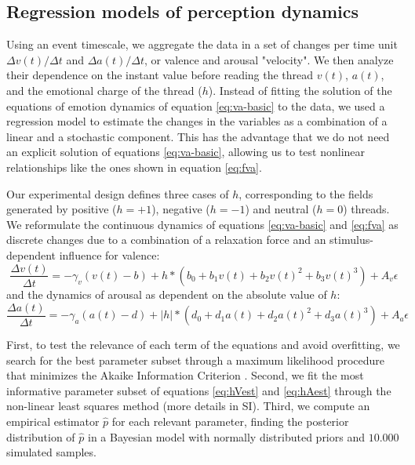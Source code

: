 \documentclass[nologo,url,11pt,a4paper]{ETHpaper}
\begin{document}
\subsection{Regression models of perception dynamics}

Using an event timescale, we aggregate the data in a set of changes per
time unit $\Delta v(t)/\Delta t$ and $\Delta a(t)/\Delta t$, or valence and arousal "velocity". 
We then analyze their dependence on the instant value before reading the thread $v(t)$, $a(t)$, and the emotional charge of the thread ($h$). 
Instead of fitting the solution of the equations of emotion dynamics of equation \ref{eq:va-basic} to the data, we used a regression model to estimate the changes in the variables as a combination of a linear and  a stochastic component.  
This has the advantage  that we do not need an explicit solution of equations \ref{eq:va-basic}, allowing us to test nonlinear relationships like the ones shown in equation \ref{eq:fva}.

Our experimental design defines three cases of $h$, corresponding to the fields generated by  positive ($h=+1$), negative ($h=-1$) and neutral ($h=0$) threads. 
We reformulate the continuous dynamics of equations \ref{eq:va-basic} and \ref{eq:fva} as discrete changes due to a combination of a relaxation force and an stimulus-dependent influence for valence:
\begin{equation}
\frac{\Delta v(t)}{\Delta t} = - \gamma_v \left ( v(t) - b \right) +  h * \left (b_0 + b_1 v(t) + b_2 v(t)^2  + b_3 v(t)^3 \right ) + A_v \epsilon
\label{eq:hVest}
\end{equation}
and the dynamics of arousal as dependent on the absolute value of $h$:
\begin{equation}
\frac{\Delta a(t)}{\Delta t} = - \gamma_a \left ( a(t) - d \right) +  |h| * \left (d_0 + d_1 a(t) + d_2 a(t)^2  + d_3 a(t)^3 \right ) + A_a \epsilon
\label{eq:hAest}
\end{equation}

First, to test the relevance of each term of the equations and avoid
overfitting,  we search for the best parameter subset through a maximum
likelihood procedure \cite{Venables2002} that minimizes  the  Akaike
Information Criterion \cite{Akaike1981}. Second, we fit the most informative
parameter subset of equations \ref{eq:hVest} and \ref{eq:hAest} through the
non-linear least squares method \cite{Bates1988} (more details in SI). Third, we compute an empirical estimator $\widehat p$ for each relevant parameter, finding the
posterior distribution of $\widehat p$ in a Bayesian model with normally
distributed priors \cite{Gelman2008} and $10.000$ simulated samples.
\end{document}
